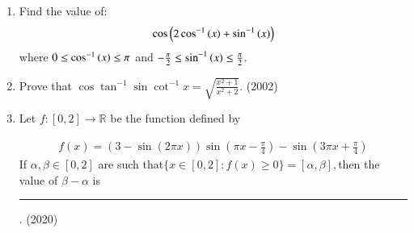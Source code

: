 \begin{enumerate}[label=\thesubsection.\arabic*,ref=\thesubsection.\theenumi]
\begin{enumerate}
\end{enumerate}
\item Find the value of: 
\begin{align*}
\cos \left(2\cos ^{-1}\left(x\right)+\sin ^{-1}\left(x\right)\right) 
\end{align*}
where $0\le \cos ^{-1}\left(x\right) \le \pi$ and $-\frac{\pi}{2}\le \sin ^{-1}\left(x\right) \le\frac{\pi}{2}$.
\hfill {}
	\item{
			Prove that $\cos \tan^{-1} \sin \cot^{-1} x = \sqrt{\frac{x^2 + 1}{x^2 + 2}}$. \hfill (2002)
		}
\item   Let $f: [0,2] \to \mathbb{R}$ be the function defined by

\begin{align}
	f(x) = (3 - \sin (2\pi x) ) \sin (\pi x - \frac{\pi}{4}) - \sin (3\pi x + \frac{\pi}{4})
\end{align}
If $\alpha, \beta \in [0,2]$ are such that$\{ x \in [0,2] : f(x) \geq 0 \} = [\alpha, \beta],$then the value of $\beta - \alpha$ is \rule{1cm}{0.1pt}.
		\hfill (2020)
\end{enumerate}
